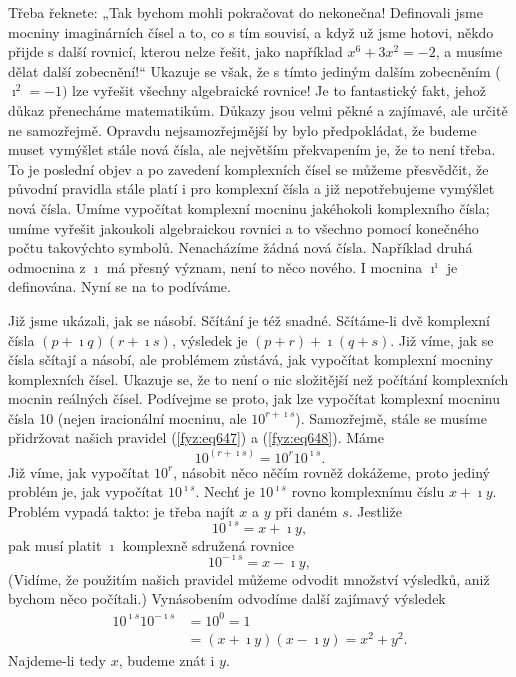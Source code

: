     Třeba řeknete: „Tak bychom mohli pokračovat do nekonečna! Deﬁnovali jsme mocniny imaginárních
    čísel a to, co s tím souvisí, a když už jsme hotovi, někdo přijde s další rovnicí, kterou nelze
    řešit, jako například \(x^6 + 3x^2 = -2\), a musíme dělat další zobecnění!“ Ukazuje se však, že
    s tímto jediným dalším zobecněním (\(\imath^2 = -1)\) lze vyřešit všechny algebraické rovnice!
    Je to fantastický fakt, jehož důkaz přenecháme matematikům. Důkazy jsou velmi pěkné a zajímavé,
    ale určitě ne samozřejmě. Opravdu nejsamozřejmější by bylo předpokládat, že budeme muset
    vymýšlet stále nová čísla, ale největším překvapením je, že to není třeba. To je poslední objev
    a po zavedení komplexních čísel se můžeme přesvědčit, že původní pravidla stále platí i pro
    komplexní čísla a již nepotřebujeme vymýšlet nová čísla. Umíme vypočítat komplexní mocninu
    jakéhokoli komplexního čísla; umíme vyřešit jakoukoli algebraickou rovnici a to všechno pomocí
    konečného počtu takovýchto symbolů. Nenacházíme žádná nová čísla. Například druhá odmocnina z
    \(\imath\) má přesný význam, není to něco nového. I mocnina \(\imath^\imath\) je deﬁnována. Nyní
    se na to podíváme.

    Již jsme ukázali, jak se násobí. Sčítání je též snadné. Sčítáme-li dvě komplexní čísla \((p +
    \imath q)(r + \imath s)\), výsledek je \((p + r) + \imath(q + s)\). Již víme, jak se čísla
    sčítají a násobí, ale problémem zůstává, jak vypočítat komplexní mocniny komplexních čísel.
    Ukazuje se, že to není o nic složitější než počítání komplexních mocnin reálných čísel.
    Podívejme se proto, jak lze vypočítat komplexní mocninu čísla \num{10} (nejen iracionální
    mocninu, ale \(10^{r+\imath s}\)). Samozřejmě, stále se musíme přidržovat našich pravidel
    (\ref{fyz:eq647}) a (\ref{fyz:eq648}). Máme
    \begin{equation}\label{fyz:eq698}
      10^{(r+\imath s)}=10^r10^{\imath s}.
    \end{equation}
    Již víme, jak vypočítat \(10^r\), násobit něco něčím rovněž dokážeme, proto jediný problém je,
    jak vypočítat \(10^{\imath s}\). Nechť je \(10^{\imath s}\) rovno komplexnímu číslu \(x + \imath
    y\). Problém vypadá takto: je třeba najít \(x\) a \(y\) při daném \(s\). Jestliže
    \begin{equation*}
      10^{\imath s} = x + \imath y,
    \end{equation*}
    pak musí platit \(\imath\) komplexně sdružená rovnice
    \begin{equation*}
      10^{-\imath s} = x - \imath y,
    \end{equation*}
    (Vidíme, že použitím našich pravidel můžeme odvodit množství výsledků, aniž bychom něco
    počítali.) Vynásobením odvodíme další zajímavý výsledek
    \begin{align}
      10^{\imath s}10^{−\imath s} &=10^0=1                                     \nonumber\\
                                  &=(x+\imath y)(x−\imath y)=x^2+y^2.          \label{fyz:eq699}
    \end{align}
    Najdeme-li tedy \(x\), budeme znát i \(y\).

